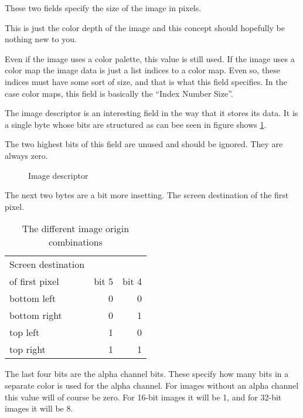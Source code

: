 \begin{refsection}


  These two fields specify the size of the image in pixels.


  This is just the color depth of the image and this concept should
  hopefully be nothing new to you.

  Even if the image uses a color palette, this value is still used. If
  the image uses a color map the image data is just a list indices to
  a color map. Even so, these indices must have some sort of size, and
  that is what this field specifies. In the case color maps, this
  field is basically the ``Index Number Size''.


  The image descriptor is an interesting field in the way that it
  stores its data. It is a single byte whose bits are structured as
  can bee seen in figure shows \ref{fig:tga-image-desc}.

  The two highest bits of this field are unused and should be
  ignored. They are always zero.

  \begin{figure}[H]
    \centering
    \caption{Image descriptor}
    \label{fig:tga-image-desc}
  \end{figure}

  The next two bytes are a bit more insetting. The screen destination
  of the first pixel.

  \begin{table}
    \centering
    \begin{tabular}{lrr}
      \toprule
      Screen destination \\ of first pixel & bit 5 & bit 4 \\
      \midrule
      bottom left & 0 & 0 \\
      bottom right & 0 & 1 \\
      top left & 1 & 0 \\
      top right & 1 & 1 \\
      \bottomrule
    \end{tabular}
    \caption{The different image origin combinations}
    \label{tab:image-origin}
  \end{table}

  The last four bits are the alpha channel bits. These specify how
  many bits in a separate color is used for the alpha channel. For
  images without an alpha channel this value will of course be
  zero. For 16-bit images it will be 1, and for 32-bit images it will
  be 8.


\end{refsection}
